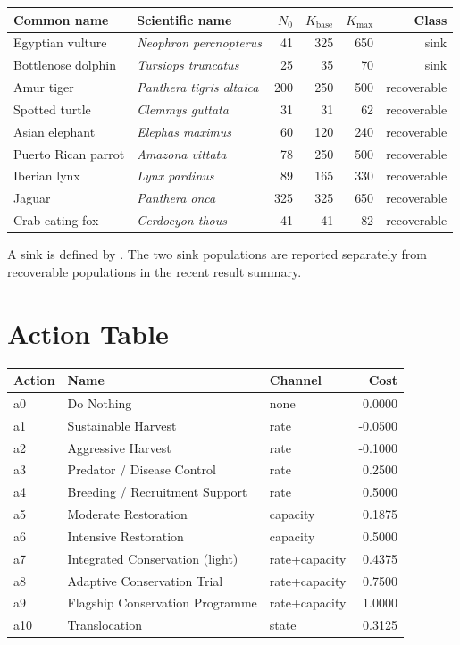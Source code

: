 \documentclass[11pt]{article}
\begin{document}
\begin{center}
\begin{tabularx}{\linewidth}{llrrrr}
\toprule
Common name & Scientific name & $N_0$ & $K_{\mathrm{base}}$ & $K_{\max}$ & Class \\
\midrule
Egyptian vulture & \emph{Neophron percnopterus} & 41 & 325 & 650 & sink \\
Bottlenose dolphin & \emph{Tursiops truncatus} & 25 & 35 & 70 & sink \\
Amur tiger & \emph{Panthera tigris altaica} & 200 & 250 & 500 & recoverable \\
Spotted turtle & \emph{Clemmys guttata} & 31 & 31 & 62 & recoverable \\
Asian elephant & \emph{Elephas maximus} & 60 & 120 & 240 & recoverable \\
Puerto Rican parrot & \emph{Amazona vittata} & 78 & 250 & 500 & recoverable \\
Iberian lynx & \emph{Lynx pardinus} & 89 & 165 & 330 & recoverable \\
Jaguar & \emph{Panthera onca} & 325 & 325 & 650 & recoverable \\
Crab-eating fox & \emph{Cerdocyon thous} & 41 & 41 & 82 & recoverable \\
\bottomrule
\end{tabularx}
\end{center}

A sink is defined by . The two sink populations are
reported separately from recoverable populations in the recent result summary.

\section{Action Table}

\begin{center}
\begin{tabularx}{\linewidth}{lllr}
\toprule
Action & Name & Channel & Cost \\
\midrule
a0 & Do Nothing & none & 0.0000 \\
a1 & Sustainable Harvest & rate & -0.0500 \\
a2 & Aggressive Harvest & rate & -0.1000 \\
a3 & Predator / Disease Control & rate & 0.2500 \\
a4 & Breeding / Recruitment Support & rate & 0.5000 \\
a5 & Moderate Restoration & capacity & 0.1875 \\
a6 & Intensive Restoration & capacity & 0.5000 \\
a7 & Integrated Conservation (light) & rate+capacity & 0.4375 \\
a8 & Adaptive Conservation Trial & rate+capacity & 0.7500 \\
a9 & Flagship Conservation Programme & rate+capacity & 1.0000 \\
a10 & Translocation & state & 0.3125 \\
\bottomrule
\end{tabularx}
\end{center}
\end{document}
